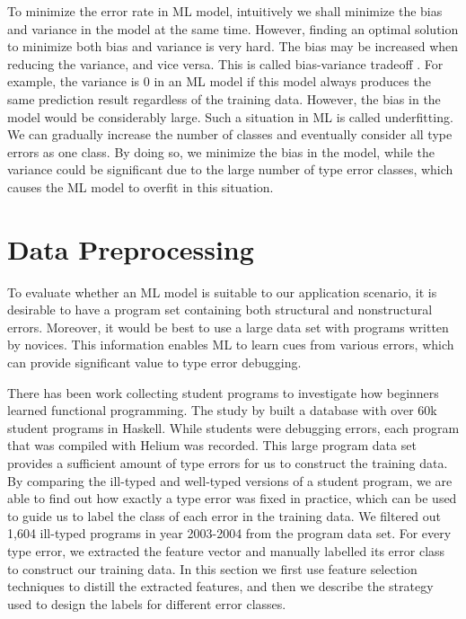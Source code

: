 \documentclass[12pt]{report}	%
\begin{document}
To minimize the error rate in ML model,
intuitively we shall minimize the bias and variance
in the model at the same time.
However, finding an optimal solution to minimize both bias and variance
is very hard.
The bias may be increased when reducing the variance, and vice versa.
This is called bias-variance tradeoff \cite{geman1992neural}.
For example, 
the variance is 0 in an ML model if 
this model always produces the same prediction result
regardless of the training data.
%
However, the bias in the model would be considerably large.
Such a situation in ML is called underfitting.
We can gradually increase the number of classes and 
eventually consider all type errors as
one class. By doing so, we minimize the bias in the model, while the variance
could be significant due to the large number of type error classes, 
which causes the ML model to overfit in this situation.

\section{Data Preprocessing}
\label{sec:ml:prep}

To evaluate whether an ML model is suitable to our application scenario,
it is desirable to have a program set containing both structural and nonstructural errors.
Moreover, it would be best to use a large data set with programs written
by novices.
This information enables ML to learn cues from various errors, which can
provide significant value to type error debugging.

There has been work collecting student programs to investigate how beginners learned
functional programming.
The study by \cite{hage2006mining} built a database with
over 60k student programs in Haskell.
While students were debugging errors,
each program that was
compiled with Helium was recorded.
This large program data set provides a sufficient amount of type errors for us
to construct the training data.
By comparing the ill-typed and well-typed versions of a student program,
we are able to find out how exactly a type error
was fixed in practice, which can be used to guide us
to label the class of each error in the training data.
We filtered out 1,604 ill-typed programs in year 2003-2004 from the program data set.
For every type error, we extracted the feature vector and manually labelled
its error class to construct our training data.
%
In this section we first use feature selection techniques to distill the extracted features,
and then we describe the strategy used to design the labels for different error classes.
\end{document}
